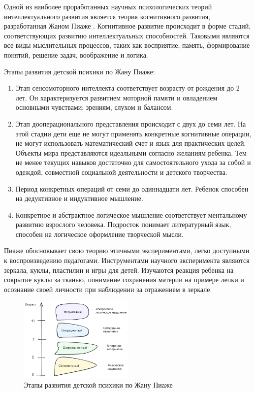 Одной из наиболее проработанных научных психологических теорий интеллектуального развития 
является теория когнитивного развития, разработанная Жаном Пиаже \cite{piaget1952origins}.
Когнитивное развитие происходит в форме стадий, соответствующих развитию интеллектуальных
способностей. Таковыми являются все виды мыслительных процессов, таких как восприятие,
память, формирование понятий, решение задач, воображение и логика.

Этапы развития детской психики по Жану Пиаже:
\begin{enumerate}
    \item Этап сенсомоторного интеллекта соответствует возрасту от рождения до 2 лет. 
    Он характеризуется развитием моторной памяти и овладением основными чувствами: зрениям, слухом и балансом.
    \item Этап дооперационального представления происходит с двух до семи лет. На этой стадии дети еще не могут
    применять конкретные когнитивные операции, не могут использовать математический счет и язык для практических целей.
    Объекты мира представляются идеальными согласно желаниям ребенка. Тем не менее текущих навыков достаточно для самостоятельного ухода
    за собой и одеждой, совместной социальной деятельности и детского творчества.
    \item Период конкретных операций от семи до одиннадцати лет. Ребенок способен на дедуктивное и индуктивное мышление.
    \item Конкретное и абстрактное логическое мышление соответствует ментальному развитию взрослого человека. Подросток понимает
    литературный язык, способен на логическое оформление творческой мысли.
\end{enumerate}

Пиаже обосновывает свою теорию этичными экспериментами, легко доступными к воспроизведению педагогами.
Инструментами научного эксперимента являются зеркала, куклы, пластилин и игры для детей. Изучаются реакция ребенка
на сокрытие куклы за тканью, понимание сохранения материи на примере лепки и осознание своей личности при наблюдении
за отражением в зеркале.

\begin{figure}[h]
    \centering
    \includegraphics[width=0.5\textwidth]{assets/pedagogic/psy/piage.excalidraw.png}
    \caption{Этапы развития детской психики по Жану Пиаже \cite{piaget1952origins}}
    \label{piage}
\end{figure}

